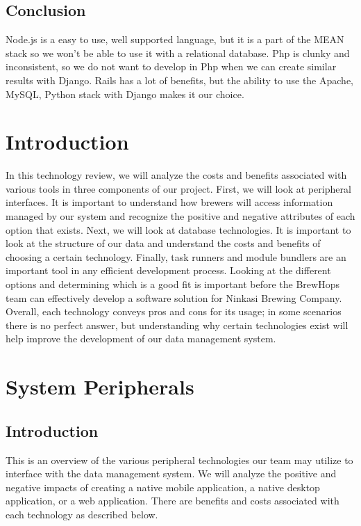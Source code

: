 \documentclass[draftclsnofoot,onecolumn,letterpaper,10pt,compsoc]{IEEEtran}
\begin{document}
				\subsection{Conclusion}
				Node.js is a easy to use, well supported language, but it is a part of the MEAN stack so we won’t be able to use it with a relational database.
				Php is clunky and inconsistent, so we do not want to develop in Php when we can create similar results with Django.
				Rails has a lot of benefits, but the ability to use the Apache, MySQL, Python stack with Django makes it our choice.

		\clearpage

		\section{Introduction}
		In this technology review, we will analyze the costs and benefits associated with various tools in three components of our project.
		First, we will look at peripheral interfaces.
		It is important to understand how brewers will access information managed by our system and recognize the positive and negative attributes of each option that exists.
		Next, we will look at database technologies.
		It is important to look at the structure of our data and understand the costs and benefits of choosing a certain technology.
		Finally, task runners and module bundlers are an important tool in any efficient development process.
		Looking at the different options and determining which is a good fit is important before the BrewHops team can effectively develop a software solution for Ninkasi Brewing Company.
		Overall, each technology conveys pros and cons for its usage; in some scenarios there is no perfect answer, but understanding why certain technologies exist will help improve the development of our data management system.

		\section{System Peripherals}
		    \subsection{Introduction}
		        This is an overview of the various peripheral technologies our team may utilize to interface with the data management system.
		        We will analyze the positive and negative impacts of creating a native mobile application, a native desktop application, or a web application.
		        There are benefits and costs associated with each technology as described below.
\end{document}
